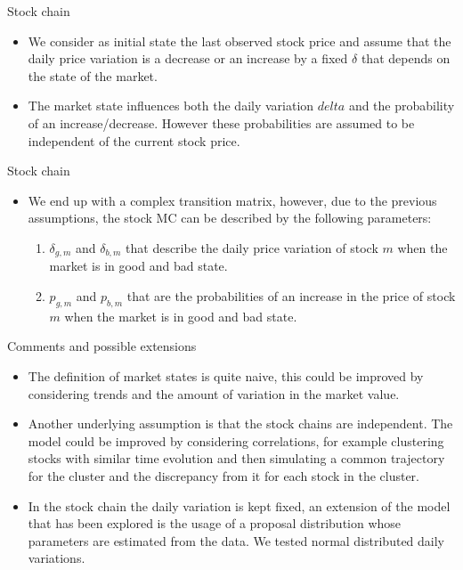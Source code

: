 \documentclass{beamer}
\begin{document}
	\begin{frame}{Stock chain}
	\begin{itemize}
		\item We consider as initial state the last observed stock price and assume that the daily price variation is a decrease or an increase by a fixed $\delta$ that depends on the 
			  state of the market.
		\item The market state influences both the daily variation $delta$ and the probability of an increase/decrease. However these probabilities are assumed to be independent of the
		      current stock price.
	\end{itemize}
	\end{frame}

	\begin{frame}{Stock chain}
	\begin{itemize}
		\item We end up with a complex transition matrix, however, due to the previous assumptions, the stock MC can be described by the following parameters:	
			\begin{center}
				\begin{enumerate}
					\item $\delta_{g,m}$ and $\delta_{b,m}$ that describe the daily price variation of stock $m$ when the market is in good and bad state.
					\item $p_{g,m}$ and $p_{b,m}$ that are the probabilities of an increase in the price of stock $m$ when the market is in good and bad state.
				\end{enumerate}
			\end{center}
	\end{itemize}
	\end{frame}

	\begin{frame}{Comments and possible extensions}
		\begin{itemize}
			\item The definition of market states is quite naive, this could be improved by considering trends and the amount of variation in the market value.
			\item Another underlying assumption is that the stock chains are independent. The model could be improved by considering correlations, for example clustering stocks with
				  similar time evolution and then simulating a common trajectory for the cluster and the discrepancy from it for each stock in the cluster.
			\item In the stock chain the daily variation is kept fixed, an extension of the model that has been explored is the usage of a proposal distribution whose parameters are 
				  estimated from the data. We tested normal distributed daily variations.
		\end{itemize}
	\end{frame}
	
\end{document}
